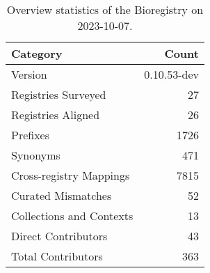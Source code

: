\begin{table}
\caption{Overview statistics of the Bioregistry on 2023-10-07.}
\label{tab:bioregistry-summary}
\begin{tabular}{lr}
\toprule
Category & Count \\
\midrule
Version & 0.10.53-dev \\
Registries Surveyed & 27 \\
Registries Aligned & 26 \\
Prefixes & 1726 \\
Synonyms & 471 \\
Cross-registry Mappings & 7815 \\
Curated Mismatches & 52 \\
Collections and Contexts & 13 \\
Direct Contributors & 43 \\
Total Contributors & 363 \\
\bottomrule
\end{tabular}
\end{table}
